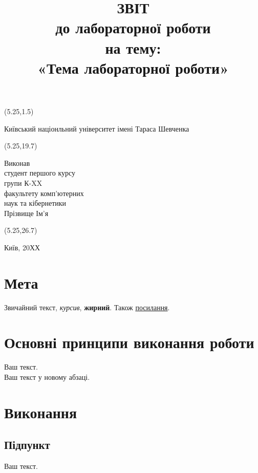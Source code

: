 \documentclass[12pt]{extreport}
\title{\textbf{ЗВІТ}\\[0.5ex]\Large до лабораторної роботи \\на тему:\\\huge «Тема лабораторної роботи»}
\author{}
\date{}
\begin{document}
\begin{textblock}{10}(5.25,1.5)
\begin{center}
\noindent\Large Київський націонльний університет імені Тараса Шевченка
\end{center}
\end{textblock}

\begin{textblock}{13}(5.25,19.7)
\begin{flushright}
\noindent\Large
Виконав\\[1ex]
студент першого курсу\\
групи К-XX\\
факультету комп'ютерних\\наук та кібернетики\\[1ex]
Прізвище Ім'я
\end{flushright}
\end{textblock}

\begin{textblock}{10}(5.25,26.7)
\begin{center}
\noindent\Large
Київ, 20ХХ
\end{center}
\end{textblock}

\maketitle

\large %

\section*{Мета}
Звичайний текст, \textit{курсив}, \textbf{жирний}. Також \href{https://github.com/vladyslavpavlenko}{посилання}.

\section*{Основні принципи виконання роботи}
Ваш текст.\\

\noindent %
Ваш текст у новому абзаці.

\section*{Виконання}
\subsection*{Підпункт}
Ваш текст.
\end{document}
